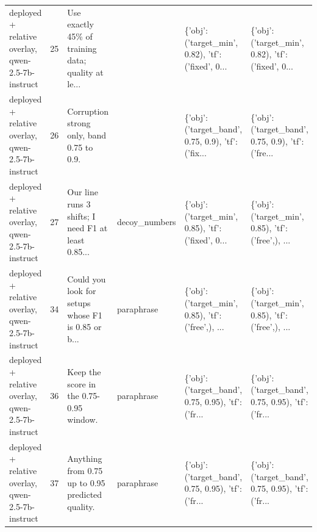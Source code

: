 \begin{tabular}{lrllll}
deployed + relative overlay, qwen-2.5-7b-instruct &   25 & Use exactly 45\% of training data; quality at le... &                        & \{'obj': ('target\_min', 0.82), 'tf': ('fixed', 0... & \{'obj': ('target\_min', 0.82), 'tf': ('fixed', 0... \\
deployed + relative overlay, qwen-2.5-7b-instruct &   26 &          Corruption strong only, band 0.75 to 0.9. &                        & \{'obj': ('target\_band', 0.75, 0.9), 'tf': ('fix... & \{'obj': ('target\_band', 0.75, 0.9), 'tf': ('fre... \\
deployed + relative overlay, qwen-2.5-7b-instruct &   27 & Our line runs 3 shifts; I need F1 at least 0.85... &          decoy\_numbers & \{'obj': ('target\_min', 0.85), 'tf': ('fixed', 0... & \{'obj': ('target\_min', 0.85), 'tf': ('free',), ... \\
deployed + relative overlay, qwen-2.5-7b-instruct &   34 & Could you look for setups whose F1 is 0.85 or b... &             paraphrase & \{'obj': ('target\_min', 0.85), 'tf': ('free',), ... & \{'obj': ('target\_min', 0.85), 'tf': ('free',), ... \\
deployed + relative overlay, qwen-2.5-7b-instruct &   36 &            Keep the score in the 0.75-0.95 window. &             paraphrase & \{'obj': ('target\_band', 0.75, 0.95), 'tf': ('fr... & \{'obj': ('target\_band', 0.75, 0.95), 'tf': ('fr... \\
deployed + relative overlay, qwen-2.5-7b-instruct &   37 &   Anything from 0.75 up to 0.95 predicted quality. &             paraphrase & \{'obj': ('target\_band', 0.75, 0.95), 'tf': ('fr... & \{'obj': ('target\_band', 0.75, 0.95), 'tf': ('fr... \\
\bottomrule
\end{tabular}
